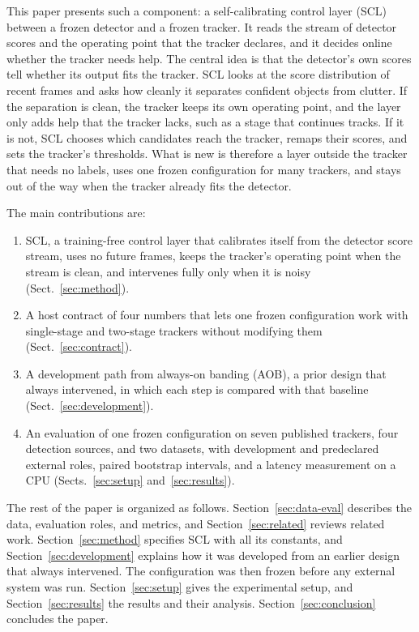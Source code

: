 \documentclass[pdflatex,sn-mathphys-num,iicol]{sn-jnl}
\newcommand{\scl}{SCL}
\newcommand{\aob}{AOB}
\begin{document}
This paper presents such a component: a self-calibrating control layer (\scl{})
between a frozen detector and a frozen tracker. It reads the stream of detector scores
and the operating point that the tracker declares, and it decides online
whether the tracker needs help. The central idea is that the detector's own
scores tell whether its output fits the tracker. \scl{} looks at the score
distribution of recent frames and asks how cleanly it separates confident
objects from clutter. If the separation is clean, the tracker keeps its own
operating point, and the layer only adds help that the tracker lacks, such as
a stage that continues tracks. If it is not, \scl{} chooses which candidates reach the
tracker, remaps their scores, and sets the tracker's thresholds. What is new
is therefore a layer outside the tracker that needs no labels, uses one frozen
configuration for many trackers, and stays out of the way when the tracker
already fits the detector.

The main contributions are:
\begin{enumerate}
\item \scl{}, a training-free control layer that calibrates itself from the detector
      score stream, uses no future frames, keeps the tracker's operating point
      when the stream is clean, and intervenes fully only when it is noisy
      (Sect.~\ref{sec:method}).
\item A host contract of four numbers that lets one frozen configuration work
      with single-stage and two-stage trackers
      without modifying them (Sect.~\ref{sec:contract}).
\item A development path from always-on banding (\aob{}), a prior design that
      always intervened, in which
      each step is compared with that baseline (Sect.~\ref{sec:development}).
\item An evaluation of one frozen configuration on seven published trackers,
      four detection sources, and two datasets, with development and
      predeclared external roles, paired bootstrap intervals, and a
      latency measurement on a CPU (Sects.~\ref{sec:setup}
      and~\ref{sec:results}).
\end{enumerate}

The rest of the paper is organized as follows. Section~\ref{sec:data-eval}
describes the data, evaluation roles, and metrics, and Section~\ref{sec:related}
reviews related work. Section~\ref{sec:method} specifies \scl{} with all its
constants, and Section~\ref{sec:development} explains how it was developed
from an earlier design that always intervened. The configuration was then
frozen before any external system was run.
Section~\ref{sec:setup} gives the experimental setup, and
Section~\ref{sec:results} the results and their analysis. Section~\ref{sec:conclusion} concludes the paper.
\end{document}
